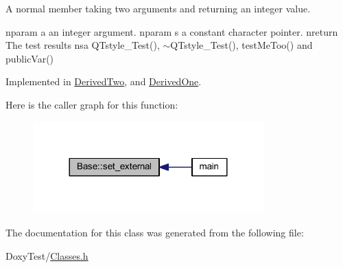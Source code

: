 A normal member taking two arguments and returning an integer value. 

nparam a an integer argument. nparam s a constant character pointer. nreturn The test results nsa Q\+Tstyle\+\_\+\+Test(), $\sim$\+Q\+Tstyle\+\_\+\+Test(), test\+Me\+Too() and public\+Var() 

Implemented in \hyperlink{class_derived_two_a84a5387e229abb415d74fb4ed8a5d913}{Derived\+Two}, and \hyperlink{class_derived_one_aa98db10f4b7ca15905aa82d942afe51b}{Derived\+One}.

Here is the caller graph for this function\+:
\nopagebreak
\begin{figure}[H]
\begin{center}
\leavevmode
\includegraphics[width=252pt]{class_base_a87ec2d3dcffa1d22d4fe4f651f625d49_icgraph}
\end{center}
\end{figure}


The documentation for this class was generated from the following file\+:\begin{DoxyCompactItemize}
\item 
Doxy\+Test/\hyperlink{_classes_8h}{Classes.\+h}\end{DoxyCompactItemize}
